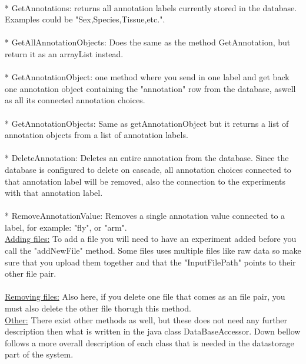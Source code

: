 \\
* GetAnnotations: returns all annotation labels currently stored in the database. Examples could be "Sex,Species,Tissue,etc.".\\
\\
* GetAllAnnotationObjects: Does the same as the method GetAnnotation, but return it as an arrayList instead.\\
\\
* GetAnnotationObject: one method where you send in one label and get back one annotation object containing the "annotation" row  from the database, aswell as all its connected annotation choices.\\
\\
* GetAnnotationObjects: Same as getAnnotationObject but it returns a list of annotation objects from a list of annotation labels.\\
\\
* DeleteAnnotation: Deletes an entire annotation from the database. Since the database is configured to delete on cascade, all annotation choices connected to that annotation label will be removed, also the connection to the experiments with that annotation label.\\
\\
* RemoveAnnotationValue: Removes a single annotation value connected to a label, for example: "fly", or "arm".\\
\newpage
\underline{Adding files:} To add a file you will need to have an experiment added before you call the "addNewFile" method. Some files uses multiple files like raw data so make sure that you upload them together and that the "InputFilePath" points to their other file pair.\\
\\
\underline{Removing files:} Also here, if you delete one file that comes as an file pair, you must also delete the other file thorugh this method.\\

\underline{Other:} There exist other methods as well, but these does not need any further description then what is written in the java class DataBaseAccessor. Down bellow follows a more overall description of each class that is needed in the datastorage part of the system.\\
